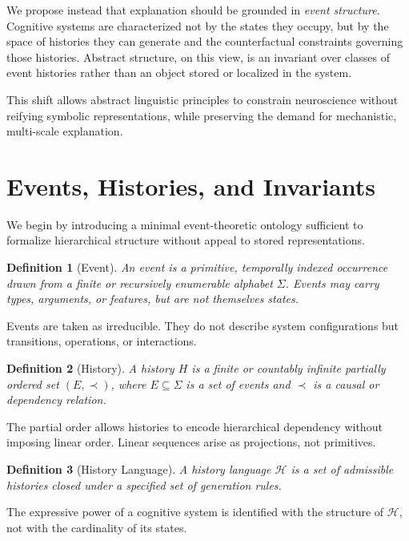 \documentclass[11pt]{article}
\newtheorem{definition}{Definition}
\begin{document}
We propose instead that explanation should be grounded in \emph{event structure}. Cognitive systems are characterized not by the states they occupy, but by the space of histories they can generate and the counterfactual constraints governing those histories. Abstract structure, on this view, is an invariant over classes of event histories rather than an object stored or localized in the system.

This shift allows abstract linguistic principles to constrain neuroscience without reifying symbolic representations, while preserving the demand for mechanistic, multi-scale explanation.

\section{Events, Histories, and Invariants}

We begin by introducing a minimal event-theoretic ontology sufficient to formalize hierarchical structure without appeal to stored representations.

\begin{definition}[Event]
An \emph{event} is a primitive, temporally indexed occurrence drawn from a finite or recursively enumerable alphabet $\Sigma$. Events may carry types, arguments, or features, but are not themselves states.
\end{definition}

Events are taken as irreducible. They do not describe system configurations but transitions, operations, or interactions.

\begin{definition}[History]
A \emph{history} $H$ is a finite or countably infinite partially ordered set $(E, \prec)$, where $E \subseteq \Sigma$ is a set of events and $\prec$ is a causal or dependency relation.
\end{definition}

The partial order allows histories to encode hierarchical dependency without imposing linear order. Linear sequences arise as projections, not primitives.

\begin{definition}[History Language]
A \emph{history language} $\mathcal{H}$ is a set of admissible histories closed under a specified set of generation rules.
\end{definition}

The expressive power of a cognitive system is identified with the structure of $\mathcal{H}$, not with the cardinality of its states.
\end{document}
